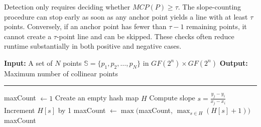 \documentclass[a4paper,11pt]{llncs}
\begin{document}
Detection only requires deciding whether $MCP(P)\ge \tau$. The slope-counting
procedure can stop early as soon as any anchor point yields a line with at least
$\tau$ points. Conversely, if an anchor point has fewer than $\tau-1$ remaining
points, it cannot create a $\tau$-point line and can be skipped. These checks
often reduce runtime substantially in both positive and negative cases.


\begin{algorithm*}[htbp]
\caption{Hashing-based MCP (Maximum Collinear Points)}
\label{alg:hash_MCP}
\begin{algorithmic}[1]
    \State \textbf{Input:} A set of $N$ points ${\mathbb S} = \{p_1, p_2, \dots, p_N\}$ in $GF(2^n) \times GF(2^n)$
    \State \textbf{Output:} Maximum number of collinear points
        \vspace{2mm}
    \hrule
    \vspace{2mm}
    \State maxCount $\gets 1$
        \State Create an empty hash map $H$
            \State Compute slope $s = \frac{y_j - y_i}{x_j - x_i}$ {}
            \State Increment $H[s]$ by 1
        \EndFor
        \State maxCount $\gets \max($maxCount, $\max_{s \in H} (H[s] + 1))$
    \EndFor
    \State \Return maxCount
\end{algorithmic}
\end{algorithm*}




\end{document}
